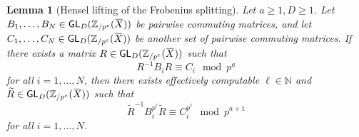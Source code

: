 \documentclass[letterpaper, 11pt, thm-restate]{article}
\numberwithin{equation}{section}
\newcommand{\N}{\mathbb{N}}
\newcommand{\Zpe}{\mathbb{Z}_{/p^e}}
\newcommand{\GL}{\mathsf{GL}}
\newcommand{\tR}{\widetilde{R}}
\newcommand{\oX}{\mkern 1.5mu\overline{\mkern-1.5mu X \mkern-1.5mu}\mkern 1.5mu}
\newtheorem{lem}[thrm]{Lemma}
\theoremstyle{definition}
\theoremstyle{definition}
\theoremstyle{definition}
\begin{document}
\begin{lem}[Hensel lifting of the Frobenius splitting]\label{lem:Hensel}
    Let $a \geq 1, D \geq 1$.
    Let $B_1, \ldots, B_N \in \GL_D(\Zpe(\oX))$ be pairwise commuting matrices, and let $C_1, \ldots, C_N \in \GL_D(\Zpe(\oX))$ be another set of pairwise commuting matrices.
    If there exists a matrix $R \in \GL_D(\Zpe(\oX))$ such that 
    \[
    R^{-1} B_i R \equiv C_i \mod p^a
    \]
    for all $i = 1, \ldots, N$,
    then there exists effectively computable $\ell \in \N$ and $\tR \in \GL_D(\Zpe(\oX))$ such that
    \[
    \tR^{-1} B_i^{p^{\ell}} \tR \equiv C_i^{p^{\ell}} \mod p^{a+1}
    \]
    for all $i = 1, \ldots, N$.
\end{lem}
\end{document}
